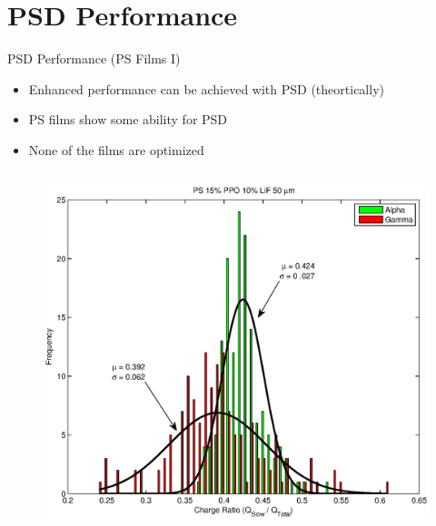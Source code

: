 
% 
%
\section{PSD Performance}

\begin{frame}{PSD Performance (PS Films I)}
\small
\begin{itemize}
	\item Enhanced performance can be achieved with PSD (theortically)
	\item PS films show some ability for PSD
	\item None of the films are optimized \cite{zaitseva_plastic_2012}
\end{itemize}
\begin{columns}[onlytextwidth]
\begin{column}{0.25\textwidth}
	\tiny
	\begin{figure}
		\centering
		\includegraphics[width=\textwidth]{images/ChargeIntegration_PS_LiF_POP_50um.eps}

\end{figure}
\end{column}
\end{columns}
\end{frame}
